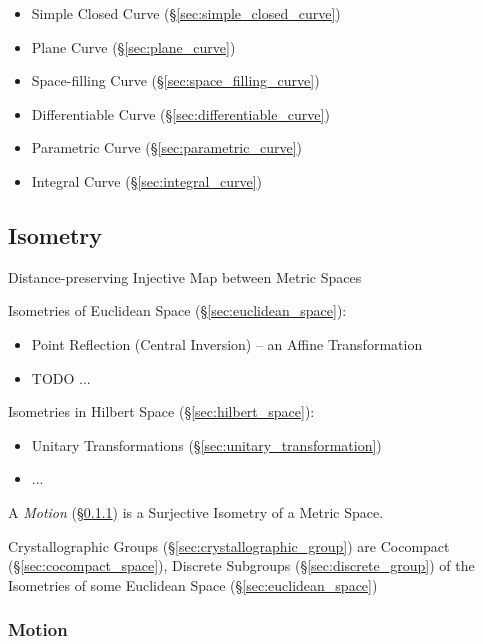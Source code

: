 \begin{itemize}
  \item Simple Closed Curve (\S\ref{sec:simple_closed_curve})
  \item Plane Curve (\S\ref{sec:plane_curve})
  \item Space-filling Curve (\S\ref{sec:space_filling_curve})
  \item Differentiable Curve (\S\ref{sec:differentiable_curve})
  \item Parametric Curve (\S\ref{sec:parametric_curve})
  \item Integral Curve (\S\ref{sec:integral_curve})
\end{itemize}



\subsection{Isometry}\label{sec:isometry}

Distance-preserving Injective Map between Metric Spaces

Isometries of Euclidean Space (\S\ref{sec:euclidean_space}):
\begin{itemize}
  \item Point Reflection (Central Inversion) -- an Affine Transformation
  \item TODO
  ...
\end{itemize}

Isometries in Hilbert Space (\S\ref{sec:hilbert_space}):
\begin{itemize}
  \item Unitary Transformations (\S\ref{sec:unitary_transformation})
  \item ...
\end{itemize}

A \emph{Motion} (\S\ref{sec:motion}) is a Surjective Isometry of a Metric
Space.

Crystallographic Groups (\S\ref{sec:crystallographic_group}) are Cocompact
(\S\ref{sec:cocompact_space}), Discrete Subgroups (\S\ref{sec:discrete_group})
of the Isometries of some Euclidean Space (\S\ref{sec:euclidean_space})



\subsubsection{Motion}\label{sec:motion}

